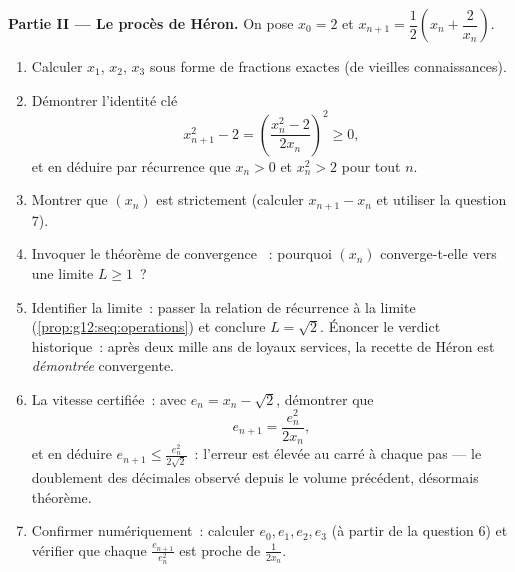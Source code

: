 \begin{problem}
\medskip
\noindent\textbf{Partie II --- Le procès de Héron.}
On pose $x_0 = 2$ et $x_{n+1} = \dfrac12\left(x_n +
\dfrac{2}{x_n}\right)$.
\begin{enumerate}[resume]
  \item Calculer $x_1$, $x_2$, $x_3$ sous forme de fractions
        exactes (de vieilles connaissances).
  \item Démontrer l'identité clé
        \[
        x_{n+1}^2 - 2 = \left(\frac{x_n^2 - 2}{2x_n}\right)^{\!2}
        \geq 0,
        \]
        et en déduire par récurrence que $x_n > 0$ et $x_n^2 > 2$
        pour tout $n$.
  \item Montrer que $(x_n)$ est strictement  (calculer
        $x_{n+1} - x_n$ et utiliser la question 7).
  \item Invoquer le théorème de convergence ~: pourquoi
        $(x_n)$ converge-t-elle vers une limite $L \geq 1$~?
  \item Identifier la limite~: passer la relation de récurrence à
        la limite (\cref{prop:g12:seq:operations}) et conclure
        $L = \sqrt2$. Énoncer le verdict historique~: après deux
        mille ans de loyaux services, la recette de Héron est
        \emph{démontrée} convergente.
  \item La vitesse certifiée~: avec $e_n = x_n - \sqrt2$,
        démontrer que
        \[
        e_{n+1} = \frac{e_n^2}{2 x_n} ,
        \]
        et en déduire $e_{n+1} \leq \frac{e_n^2}{2\sqrt2}$~:
        l'erreur est élevée au carré à chaque pas --- le doublement
        des décimales observé depuis le volume précédent, désormais
        théorème.
  \item Confirmer numériquement~: calculer $e_0, e_1, e_2, e_3$ (à
        partir de la question 6) et vérifier que chaque
        $\frac{e_{n+1}}{e_n^2}$ est proche de $\frac{1}{2x_n}$.
\end{enumerate}


\end{problem}

